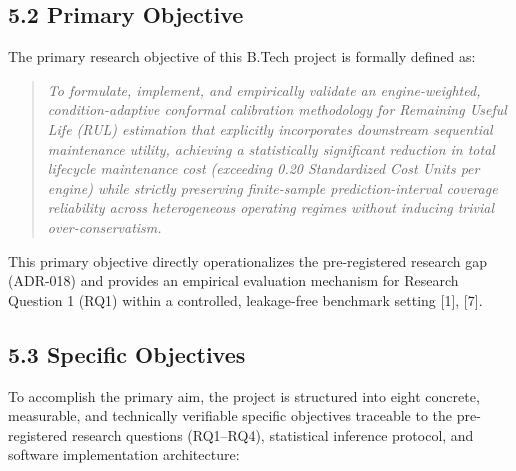 \documentclass[12pt,a4paper]{article}
\begin{document}
\subsection*{5.2 Primary Objective}
The primary research objective of this B.Tech project is formally defined as:
\begin{quote}
\textit{To formulate, implement, and empirically validate an engine-weighted, condition-adaptive conformal calibration methodology for Remaining Useful Life (RUL) estimation that explicitly incorporates downstream sequential maintenance utility, achieving a statistically significant reduction in total lifecycle maintenance cost (exceeding 0.20 Standardized Cost Units per engine) while strictly preserving finite-sample prediction-interval coverage reliability across heterogeneous operating regimes without inducing trivial over-conservatism.}
\end{quote}
This primary objective directly operationalizes the pre-registered research gap (ADR-018) and provides an empirical evaluation mechanism for Research Question 1 (RQ1) within a controlled, leakage-free benchmark setting [1], [7].

\subsection*{5.3 Specific Objectives}
To accomplish the primary aim, the project is structured into eight concrete, measurable, and technically verifiable specific objectives traceable to the pre-registered research questions (RQ1--RQ4), statistical inference protocol, and software implementation architecture:
\end{document}
